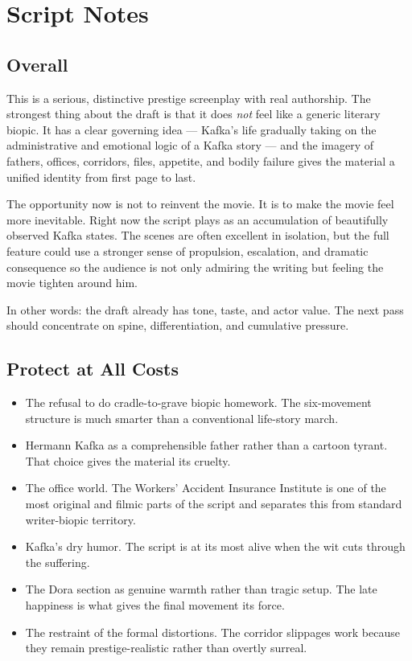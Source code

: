 
\section{Script Notes}

\subsection{Overall}

This is a serious, distinctive prestige screenplay with real authorship. The strongest thing about the draft is that it does \emph{not} feel like a generic literary biopic. It has a clear governing idea --- Kafka's life gradually taking on the administrative and emotional logic of a Kafka story --- and the imagery of fathers, offices, corridors, files, appetite, and bodily failure gives the material a unified identity from first page to last.

The opportunity now is not to reinvent the movie. It is to make the movie feel more inevitable. Right now the script plays as an accumulation of beautifully observed Kafka states. The scenes are often excellent in isolation, but the full feature could use a stronger sense of propulsion, escalation, and dramatic consequence so the audience is not only admiring the writing but feeling the movie tighten around him.

In other words: the draft already has tone, taste, and actor value. The next pass should concentrate on spine, differentiation, and cumulative pressure.

\subsection{Protect at All Costs}

\begin{itemize}
\item The refusal to do cradle-to-grave biopic homework. The six-movement structure is much smarter than a conventional life-story march.
\item Hermann Kafka as a comprehensible father rather than a cartoon tyrant. That choice gives the material its cruelty.
\item The office world. The Workers' Accident Insurance Institute is one of the most original and filmic parts of the script and separates this from standard writer-biopic territory.
\item Kafka's dry humor. The script is at its most alive when the wit cuts through the suffering.
\item The Dora section as genuine warmth rather than tragic setup. The late happiness is what gives the final movement its force.
\item The restraint of the formal distortions. The corridor slippages work because they remain prestige-realistic rather than overtly surreal.
\end{itemize}

